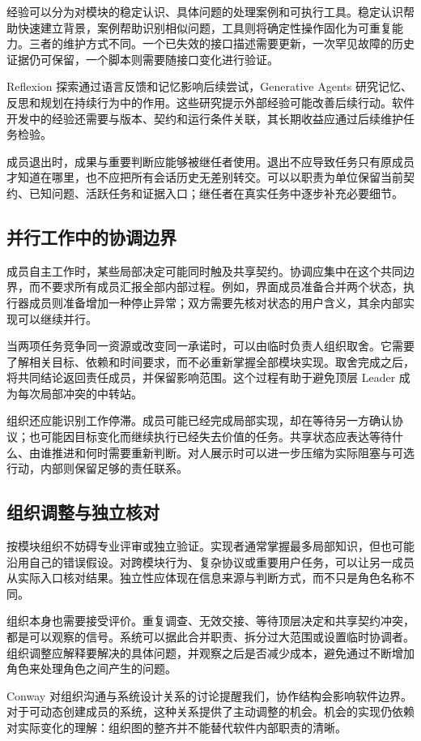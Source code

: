 经验可以分为对模块的稳定认识、具体问题的处理案例和可执行工具。稳定认识帮助快速建立背景，案例帮助识别相似问题，工具则将确定性操作固化为可重复能力。三者的维护方式不同。一个已失效的接口描述需要更新，一次罕见故障的历史证据仍可保留，一个脚本则需要随接口变化进行验证。

Reflexion 探索通过语言反馈和记忆影响后续尝试\cite{reflexion}，Generative Agents 研究记忆、反思和规划在持续行为中的作用\cite{generativeagents}。这些研究提示外部经验可能改善后续行动。软件开发中的经验还需要与版本、契约和运行条件关联，其长期收益应通过后续维护任务检验。

成员退出时，成果与重要判断应能够被继任者使用。退出不应导致任务只有原成员才知道在哪里，也不应把所有会话历史无差别转交。可以以职责为单位保留当前契约、已知问题、活跃任务和证据入口；继任者在真实任务中逐步补充必要细节。

\subsection{并行工作中的协调边界}
成员自主工作时，某些局部决定可能同时触及共享契约。协调应集中在这个共同边界，而不要求所有成员汇报全部内部过程。例如，界面成员准备合并两个状态，执行器成员则准备增加一种停止异常；双方需要先核对状态的用户含义，其余内部实现可以继续并行。

当两项任务竞争同一资源或改变同一承诺时，可以由临时负责人组织取舍。它需要了解相关目标、依赖和时间要求，而不必重新掌握全部模块实现。取舍完成之后，将共同结论返回责任成员，并保留影响范围。这个过程有助于避免顶层 Leader 成为每次局部冲突的中转站。

组织还应能识别工作停滞。成员可能已经完成局部实现，却在等待另一方确认协议；也可能因目标变化而继续执行已经失去价值的任务。共享状态应表达等待什么、由谁推进和何时需要重新判断。对人展示时可以进一步压缩为实际阻塞与可选行动，内部则保留足够的责任联系。

\subsection{组织调整与独立核对}
按模块组织不妨碍专业评审或独立验证。实现者通常掌握最多局部知识，但也可能沿用自己的错误假设。对跨模块行为、复杂协议或重要用户任务，可以让另一成员从实际入口核对结果。独立性应体现在信息来源与判断方式，而不只是角色名称不同。

组织本身也需要接受评价。重复调查、无效交接、等待顶层决定和共享契约冲突，都是可以观察的信号。系统可以据此合并职责、拆分过大范围或设置临时协调者。组织调整应解释要解决的具体问题，并观察之后是否减少成本，避免通过不断增加角色来处理角色之间产生的问题。

Conway 对组织沟通与系统设计关系的讨论\cite{conway1968}提醒我们，协作结构会影响软件边界。对于可动态创建成员的系统，这种关系提供了主动调整的机会。机会的实现仍依赖对实际变化的理解：组织图的整齐并不能替代软件内部职责的清晰。
